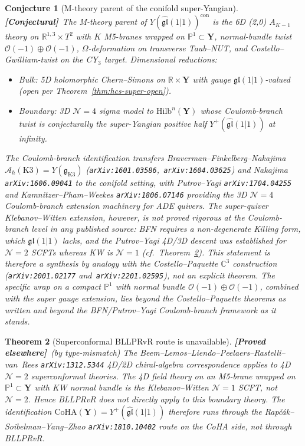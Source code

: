 \documentclass[11pt]{amsart}
\newtheorem{theorem}{Theorem}[section]
\newtheorem{conjecture}[theorem]{Conjecture}
\theoremstyle{definition}
\providecommand{\CoHA}{\mathrm{CoHA}}
\providecommand{\bY}{\mathbf{Y}}
\providecommand{\cO}{\mathcal{O}}
\providecommand{\cA}{\mathcal{A}}
\providecommand{\cN}{\mathcal{N}}
\providecommand{\bR}{\mathbb{R}}
\providecommand{\bC}{\mathbb{C}}
\providecommand{\bP}{\mathbb{P}}
\providecommand{\fgl}{\mathfrak{gl}}
\providecommand{\frakg}{\mathfrak{g}}
\providecommand{\ClaimStatusProvedElsewhere}{\textbf{\textsf{[Proved elsewhere]}}}
\providecommand{\ClaimStatusConjectured}{\textbf{\textsf{[Conjectural]}}}
\begin{document}
\begin{conjecture}[M-theory parent of the conifold super-Yangian]
\label{conj:m-theory-parent}
\ClaimStatusConjectured\
The M-theory parent of $Y(\widehat{\fgl}(1|1))^{\mathrm{con}}$ is the 6D
(2,0) $A_{K-1}$ theory on $\bR^{1,3} \times T^2$ with $K$ M5-branes
wrapped on $\bP^1 \subset \bY$, normal-bundle twist $\cO(-1) \oplus
\cO(-1)$, $\Omega$-deformation on transverse Taub--NUT, and
Costello--Gwilliam-twist on the CY$_3$ target. Dimensional reductions:
\begin{itemize}[leftmargin=2em]
\item \emph{Bulk}: 5D holomorphic Chern--Simons on $\bR \times \bY$ with
  gauge $\fgl(1|1)$-valued (open per
  Theorem~\ref{thm:hcs-super-open}).
\item \emph{Boundary}: 3D $\cN = 4$ sigma model to $\mathrm{Hilb}^n(\bY)$
  whose Coulomb-branch twist is conjecturally the super-Yangian positive
  half $Y^+(\widehat{\fgl}(1|1))$ at infinity.
\end{itemize}
The Coulomb-branch identification transfers Braverman--Finkelberg--Nakajima
$\cA_\hbar(\mathrm{K3}) = Y(\frakg_{\mathrm{K3}})$
(\texttt{arXiv:1601.03586},~\texttt{arXiv:1604.03625}) and Nakajima
\texttt{arXiv:1606.09041} to the conifold setting, with Putrov--Yagi
\texttt{arXiv:1704.04255} and Kamnitzer--Pham--Weekes \texttt{arXiv:1806.07146}
providing the 3D $\cN=4$ Coulomb-branch extension machinery for ADE quivers.
The super-quiver Klebanov--Witten extension, however, is \emph{not} proved
rigorous at the Coulomb-branch level in any published source: BFN requires
a non-degenerate Killing form, which $\fgl(1|1)$ lacks, and the Putrov--Yagi
4D/3D descent was established for $\cN = 2$ SCFTs whereas KW is $\cN = 1$
(cf.~Theorem~\ref{thm:bllprvr-fails}). This statement is therefore a
synthesis by analogy with the Costello--Paquette $\bC^3$ construction
(\texttt{arXiv:2001.02177} and~\texttt{arXiv:2201.02595}), not an explicit
theorem. The specific wrap on a compact $\bP^1$ with normal bundle
$\cO(-1) \oplus \cO(-1)$, combined with the super gauge extension, lies
beyond the Costello--Paquette theorems as written and beyond the
BFN/Putrov--Yagi Coulomb-branch framework as it stands.
\end{conjecture}

\begin{theorem}[Superconformal BLLPRvR route is unavailable]
\label{thm:bllprvr-fails}
\ClaimStatusProvedElsewhere\ \emph{(by type-mismatch)}
The Beem--Lemos--Liendo--Peelaers--Rastelli--van~Rees
\texttt{arXiv:1312.5344} 4D/2D chiral-algebra correspondence applies to
4D $\cN=2$ superconformal theories. The 4D field theory on an M5-brane
wrapped on $\bP^1 \subset \bY$ with KW normal bundle is the
Klebanov--Witten $\cN = 1$ SCFT, not $\cN = 2$. Hence BLLPRvR does not
directly apply to this boundary theory. The identification
$\CoHA(\bY) = Y^+(\widehat{\fgl}(1|1))$ therefore runs through the
Rapčák--Soibelman--Yang--Zhao \texttt{arXiv:1810.10402} route on the
CoHA side, not through BLLPRvR.
\end{theorem}
\end{document}
